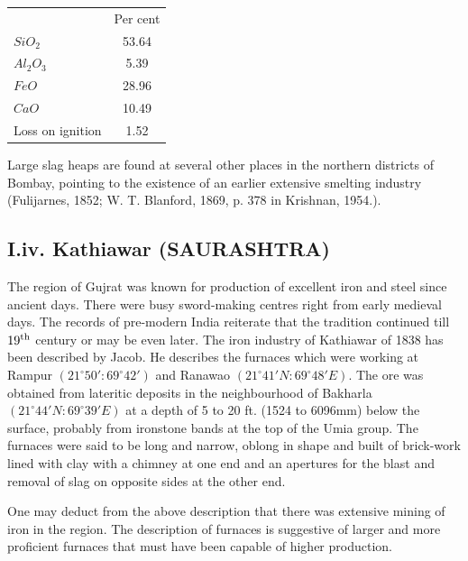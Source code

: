 \vspace{-.3cm}

\begin{center}
\begin{tabular}{lc}
& Per cent\\
$SiO_2$ & 53.64\\
$Al_2O_3$ & 5.39 \\
$FeO$ & 28.96\\
$CaO$ & 10.49\\
Loss on ignition & 1.52
\end{tabular}
\end{center}

\vspace{-.3cm}

Large slag heaps are found at several other places in the northern districts of Bombay, pointing to the existence of an earlier extensive smelting industry (Fulijarnes, 1852; W. T. Blanford, 1869, p. 378 in Krishnan, 1954.).

\vspace{-.3cm}

\subsection*{I.iv.  Kathiawar (SAURASHTRA)}\label{subsection-4}

\vspace{-.2cm}

The region of Gujrat was known for production of excellent iron and steel since ancient days. There were busy sword-making centres right from early medieval days. The records of pre-modern India reiterate that the tradition continued till $19^{\rm th}$ century or may be even later. The iron industry of Kathiawar of 1838 has been described by Jacob. He describes the furnaces which were working at Rampur $(21^\circ 50': 69^\circ 42')$ and Ranawao $(21^\circ 41'N: 69^\circ 48'E)$. The ore was obtained from lateritic deposits in the neighbourhood of Bakharla $(21^\circ 44'N: 69^\circ 39'E)$ at a depth of 5 to 20 ft. (1524 to 6096mm) below the surface, probably from ironstone bands at the top of the Umia group.  The furnaces were said to be long and narrow, oblong in shape and built of brick-work lined with clay with a chimney at one end and an apertures for the blast and removal of slag on opposite sides at the other end. 

One may deduct from the above description that there was extensive mining of iron in the region. The description of furnaces is suggestive of larger and more proficient furnaces that must have been capable of higher production. 

